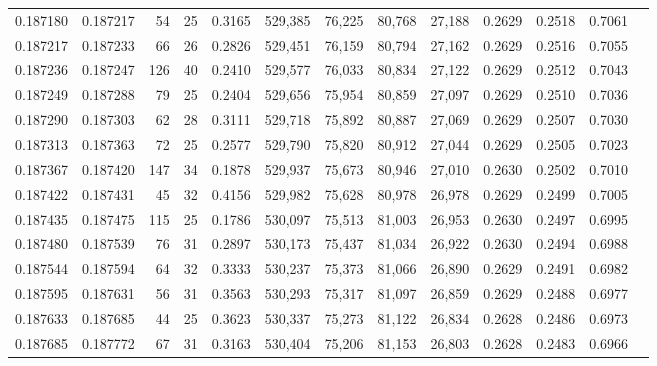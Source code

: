\begin{tabular}{rrrrrrrrrrrrr}
0.187180 & 0.187217 &    54 &  25 &                                     0.3165 & 529,385 &  76,225 &  80,768 &  27,188 & 0.2629 & 0.2518 & 0.7061 \\
0.187217 & 0.187233 &    66 &  26 &                                     0.2826 & 529,451 &  76,159 &  80,794 &  27,162 & 0.2629 & 0.2516 & 0.7055 \\
0.187236 & 0.187247 &   126 &  40 &                                     0.2410 & 529,577 &  76,033 &  80,834 &  27,122 & 0.2629 & 0.2512 & 0.7043 \\
0.187249 & 0.187288 &    79 &  25 &                                     0.2404 & 529,656 &  75,954 &  80,859 &  27,097 & 0.2629 & 0.2510 & 0.7036 \\
0.187290 & 0.187303 &    62 &  28 &                                     0.3111 & 529,718 &  75,892 &  80,887 &  27,069 & 0.2629 & 0.2507 & 0.7030 \\
0.187313 & 0.187363 &    72 &  25 &                                     0.2577 & 529,790 &  75,820 &  80,912 &  27,044 & 0.2629 & 0.2505 & 0.7023 \\
0.187367 & 0.187420 &   147 &  34 &                                     0.1878 & 529,937 &  75,673 &  80,946 &  27,010 & 0.2630 & 0.2502 & 0.7010 \\
0.187422 & 0.187431 &    45 &  32 &                                     0.4156 & 529,982 &  75,628 &  80,978 &  26,978 & 0.2629 & 0.2499 & 0.7005 \\
0.187435 & 0.187475 &   115 &  25 &                                     0.1786 & 530,097 &  75,513 &  81,003 &  26,953 & 0.2630 & 0.2497 & 0.6995 \\
0.187480 & 0.187539 &    76 &  31 &                                     0.2897 & 530,173 &  75,437 &  81,034 &  26,922 & 0.2630 & 0.2494 & 0.6988 \\
0.187544 & 0.187594 &    64 &  32 &                                     0.3333 & 530,237 &  75,373 &  81,066 &  26,890 & 0.2629 & 0.2491 & 0.6982 \\
0.187595 & 0.187631 &    56 &  31 &                                     0.3563 & 530,293 &  75,317 &  81,097 &  26,859 & 0.2629 & 0.2488 & 0.6977 \\
0.187633 & 0.187685 &    44 &  25 &                                     0.3623 & 530,337 &  75,273 &  81,122 &  26,834 & 0.2628 & 0.2486 & 0.6973 \\
0.187685 & 0.187772 &    67 &  31 &                                     0.3163 & 530,404 &  75,206 &  81,153 &  26,803 & 0.2628 & 0.2483 & 0.6966 \\

\end{tabular}

